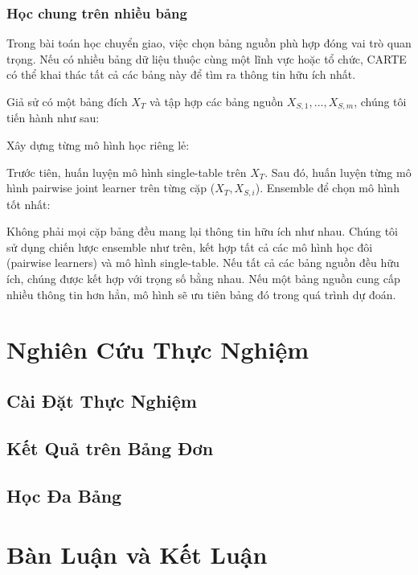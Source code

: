 \documentclass{article}
\begin{document}
\subsubsection{Học chung trên nhiều bảng}
Trong bài toán học chuyển giao, việc chọn bảng nguồn phù hợp đóng vai trò quan trọng. Nếu có nhiều bảng dữ liệu thuộc cùng một lĩnh vực hoặc tổ chức, CARTE có thể khai thác tất cả các bảng này để tìm ra thông tin hữu ích nhất.

Giả sử có một bảng đích $X_T$ và tập hợp các bảng nguồn ${X_{S,1}, ..., X_{S,m}}$, chúng tôi tiến hành như sau:

Xây dựng từng mô hình học riêng lẻ:

Trước tiên, huấn luyện mô hình single-table trên $X_T$.
Sau đó, huấn luyện từng mô hình pairwise joint learner trên từng cặp ($X_T, X_{S,i}$).
Ensemble để chọn mô hình tốt nhất:

Không phải mọi cặp bảng đều mang lại thông tin hữu ích như nhau.
Chúng tôi sử dụng chiến lược ensemble như trên, kết hợp tất cả các mô hình học đôi (pairwise learners) và mô hình single-table.
Nếu tất cả các bảng nguồn đều hữu ích, chúng được kết hợp với trọng số bằng nhau.
Nếu một bảng nguồn cung cấp nhiều thông tin hơn hẳn, mô hình sẽ ưu tiên bảng đó trong quá trình dự đoán.



\section{Nghiên Cứu Thực Nghiệm}
\subsection{Cài Đặt Thực Nghiệm}

\subsection{Kết Quả trên Bảng Đơn}

\subsection{Học Đa Bảng}

\section{Bàn Luận và Kết Luận}

\end{document}
